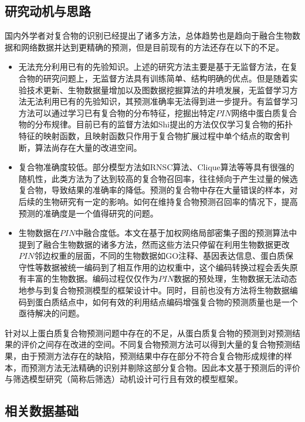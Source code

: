 \subsection{研究动机与思路}
\label{subsection:motivationAndThinking:motivation}
国内外学者对复合物的识别已经提出了诸多方法，总体趋势也是趋向于融合生物数据和网络数据并达到更精确的预测，但是目前现有的方法还存在以下的不足。
\begin{itemize}
  \item 无法充分利用已有的先验知识。上述的研究方法主要是基于无监督方法，在复合物的研究问题上，无监督方法具有训练简单、结构明确的优点。但是随着实验技术更新、生物数据量增加以及图数据挖掘算法的井喷发展，无监督学习方法无法利用已有的先验知识，其预测准确率无法得到进一步提升。有监督学习方法可以通过学习已有复合物的分布特征，挖掘出特定$PIN$网络中蛋白质复合物的分布规律。目前已有的监督方法如Shi提出的方法\cite{shi_protein_2011}仅仅学习复合物的拓扑特征的映射函数，且映射函数只作用于复合物扩展过程中单个结点的取舍判断，算法尚存在大量的改进空间。

  \item 复合物准确度较低。部分模型方法如RNSC算法\cite{king_protein_2004}、Clique算法\cite{spirin_protein_2003}等等具有很强的随机性，此类方法为了达到较高的复合物召回率，往往倾向于产生过量的候选复合物，导致结果的准确率的降低。预测的复合物中存在大量错误的样本，对后续的生物研究有一定的影响。如何在维持复合物预测召回率的情况下，提高预测的准确度是一个值得研究的问题。

  \item 生物数据在$PIN$中融合度低。本文在基于加权网络局部密集子图的预测算法中提到了融合生物数据的诸多方法，然而这些方法只停留在利用生物数据更改$PIN$邻边权重的层面，不同的生物数据如GO注释、基因表达信息、蛋白质保守性等数据被统一编码到了相互作用的边权重中，这个编码转换过程会丢失原有丰富的生物数据。编码过程仅仅作为$PIN$数据的预处理，生物数据无法动态地参与到复合物预测模型的框架设计中。同时，目前也没有方法将生物数据编码到蛋白质结点中，如何有效的利用结点编码增强复合物的预测质量也是一个亟待解决的问题。
\end{itemize}

针对以上蛋白质复合物预测问题中存在的不足，从蛋白质复合物的预测到对预测结果的评价之间存在改进的空间。不同复合物预测方法可以得到大量的复合物预测结果，由于预测方法存在的缺陷，预测结果中存在部分不符合复合物形成规律的样本，而预测方法无法精确的识别并剔除这部分复合物。因此本文基于预测后的评价与筛选模型研究（简称后筛选）动机设计可行且有效的模型框架。

\subsection{相关数据基础}
\label{subsection:motivationAndThinking:datasubstructure}

